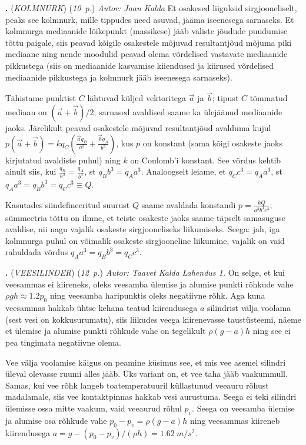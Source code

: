 \documentclass[11pt,a5paper]{article}
\newcommand{\numb}[1]{\vspace{5pt}\textbf{\large #1}}
\newcommand{\nimi}[1]{(\textsl{\small #1})}
\newcommand{\punktid}[1]{(\emph{#1~p.})}
\newcounter{ylesanne}
\newcommand{\yl}[1]{\addtocounter{ylesanne}{1}\numb{\theylesanne.} \nimi{#1} \newblock{}}
\newcommand{\autor}[1]{\emph{ Autor: #1}} %
\begin{document}
\yl{KOLMNURK}
\punktid{10} \autor{Jaan Kalda}
Et osakesed liiguksid sirgjooneliselt, peaks see kolmnurk, mille tippudes need asuvad, jääma iseenesega sarnaseks. Et kolmnurga mediaanide lõikepunkt (massikese) jääb väliste jõudude puudumise tõttu paigale, siis peavad kõigile osakestele mõjuvad resultantjõud mõjuma piki mediaane ning nende moodulid peavad olema võrdelised vastavate mediaanide pikkustega (siis on mediaanide kasvamise kiiendused ja kiirused võrdelised mediaanide pikkustega ja kolmnurk jääb iseenesega sarnaseks).

Tähistame punktist $C$ lähtuvad küljed vektoritega $\vec a$ ja $\vec b$; tipust $C$ tõmmatud mediaan on $(\vec a+\vec b)/2$; sarnased avaldised saame ka ülejäänud mediaanide jaoks. Järelikult peavad osakestele mõjuvad resultantjõud avalduma kujul $p(\vec a+\vec b)=kq_C(\frac {\vec aq_B}{a^3}+\frac {\vec bq_A}{b^3})$, kus $p$ on konstant (sama kõigi osakeste jaoks kirjutatud avaldiste puhul) ning $k$ on Coulomb'i konstant. See võrdus kehtib ainult siis, kui $\frac {q_B}{a^3}=\frac {q_A}{b^3}$, st $q_Bb^3=q_Aa^3$. Analoogselt leiame, et  $q_Cc^3=q_Aa^3$, st $q_Aa^3=q_Bb^3=q_Cc^3\equiv Q$.

Kasutades siindefineeritud suurust  $Q$ saame avaldada konstandi $p=\frac {kQ}{a^3b^3c^3}$; sümmeetria tõttu on ilmne, et teiste osakeste jaoks saame täpselt samasuguse avaldise, nii nagu vajalik osakeste sirgjooneliseks liikumiseks. Seega: jah, iga kolmnurga puhul on võimalik osakeste sirgjooneline liikumine, vajalik on vaid rahuldada võrdus $q_Aa^3=q_Bb^3=q_Cc^3$.

\yl{VEESILINDER}
\punktid{12} \autor{Taavet Kalda}
\emph{Lahendus 1.} On selge, et kui veesammas ei kiireneks, oleks veesamba ülemise ja alumise punkti rõhkude vahe $\rho gh \approx 1.2p_0$ ning veesamba haripunktis oleks negatiivne rõhk. Aga kuna veesammas hakkab ühtse kehana teatud kiirendusega $a$ silindrist välja voolama (sest vesi on kokkusurumatu), siis liikudes veega kiirenevasse taustüsteemi, näeme et ülemise ja alumise punkti rõhkude vahe on tegelikult $\rho (g - a) h$ ning see ei pea tingimata negatiivne olema.

Vee välja voolamise käigus on peamine küsimus see, et mis vee asemel silindri üleval olevasse ruumi alles jääb. Üks variant on, et vee taha jääb vaakummull. Samas, kui vee rõhk langeb toatemperatuuril küllastunud veeauru rõhust madalamale, siis vee kontaktpinnas hakkab vesi aurustuma. Seega ei teki silindri ülemisse ossa mitte vaakum, vaid veeaurud rõhul $p_v$. Seega on veesamba ülemise ja alumise osa rõhkude vahe $p_0 - p_v = \rho (g - a)h$ ning veesammas kiireneb kiirendusega $a = g - (p_0 - p_v)/(\rho h) = \SI{1.62}{m/s^2}$.
\end{document}
